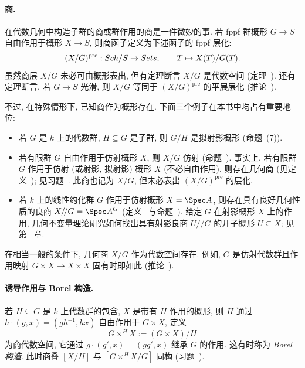 \paragraph{商.}
在代数几何中构造子群的商或群作用的商是一件微妙的事. 若 fppf 群概形 $G\to S$ 自由作用于概形 $X\to S$, 则商函子定义为下述函子的 fppf 层化:
\[
(X/G)^{\mathrm{pre}}:Sch/S\to Sets,\qquad T\mapsto X(T)/G(T).
\]
虽然商层 $X/G$ 未必可由概形表出, 但有定理断言 $X/G$ 是代数空间 (定理~). 还有定理断言, 若 $G\to S$ 光滑, 则 $X/G$ 等同于 $(X/G)^{\mathrm{pre}}$ 的平展层化 (推论~).

不过, 在特殊情形下, 已知商作为概形存在. 下面三个例子在本书中均占有重要地位:
\begin{itemize}
\item 若 $G$ 是 $k$ 上的代数群, $H\subseteq G$ 是子群, 则 $G/H$ 是拟射影概形 (命题~(7)).
\item 若有限群 $G$ 自由作用于仿射概形 $X$, 则 $X/G$ 仿射 (命题~). 事实上, 若有限群 $G$ 作用于仿射 (或射影, 拟射影) 概形 $X$ (不必自由作用), 则存在几何商 (见定义~); 见习题~. 此商也记为 $X/G$, 但未必表出 $(X/G)^{\mathrm{pre}}$ 的层化.
\item 若 $k$ 上的线性约化群 $G$ 作用于仿射概形 $X=\Spec A$, 则存在具有良好几何性质的良商 $X/\!/G=\Spec A^G$ (定义~ 与命题~). 给定 $G$ 在射影概形 $X$ 上的作用, 几何不变量理论研究如何找出具有射影良商 $U/\!/G$ 的开子概形 $U\subseteq X$; 见第~ 章.
\end{itemize}
在相当一般的条件下, 几何商 $X/G$ 作为代数空间存在. 例如, $G$ 是仿射代数群且作用映射 $G\times X\to X\times X$ 固有时即如此 (推论~).

\paragraph{诱导作用与 Borel 构造.}
若 $H\subseteq G$ 是 $k$ 上代数群的包含, $X$ 是带有 $H$-作用的概形, 则 $H$ 通过 $h\cdot(g,x)=(gh^{-1},hx)$ 自由作用于 $G\times X$, 定义
\[
G\times^H X:=(G\times X)/H
\]
为商代数空间, 它通过 $g\cdot(g',x)=(gg',x)$ 继承 $G$ 的作用. 这有时称为 \textit{Borel 构造}. 此时商叠 $[X/H]$ 与 $[G\times^H X/G]$ 同构 (习题~).

